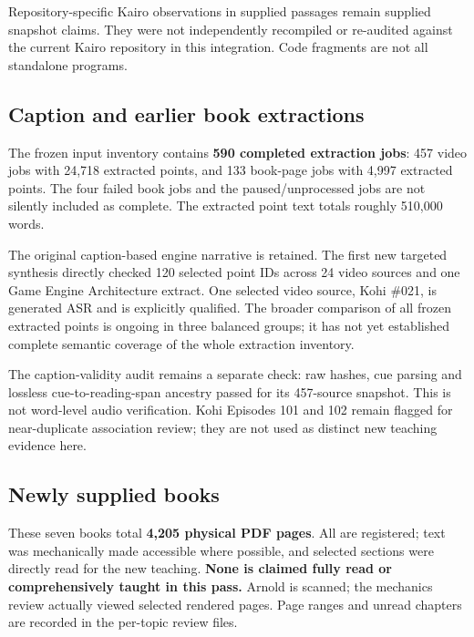 Repository-specific Kairo observations in supplied passages remain supplied snapshot claims. They were not independently recompiled or re-audited against the current Kairo repository in this integration. Code fragments are not all standalone programs.

\subsection{Caption and earlier book extractions}\label{appendix-3b67654799a2-caption-and-earlier-book-extractions}

The frozen input inventory contains \textbf{590 completed extraction jobs}: 457 video jobs with 24,718 extracted points, and 133 book-page jobs with 4,997 extracted points. The four failed book jobs and the paused/unprocessed jobs are not silently included as complete. The extracted point text totals roughly 510,000 words.

The original caption-based engine narrative is retained. The first new targeted synthesis directly checked 120 selected point IDs across 24 video sources and one Game Engine Architecture extract. One selected video source, Kohi \#021, is generated ASR and is explicitly qualified. The broader comparison of all frozen extracted points is ongoing in three balanced groups; it has not yet established complete semantic coverage of the whole extraction inventory.

The caption-validity audit remains a separate check: raw hashes, cue parsing and lossless cue-to-reading-span ancestry passed for its 457-source snapshot. This is not word-level audio verification. Kohi Episodes 101 and 102 remain flagged for near-duplicate association review; they are not used as distinct new teaching evidence here.

\subsection{Newly supplied books}\label{appendix-3b67654799a2-newly-supplied-books}

These seven books total \textbf{4,205 physical PDF pages}. All are registered; text was mechanically made accessible where possible, and selected sections were directly read for the new teaching. \textbf{None is claimed fully read or comprehensively taught in this pass.} Arnold is scanned; the mechanics review actually viewed selected rendered pages. Page ranges and unread chapters are recorded in the per-topic review files.

